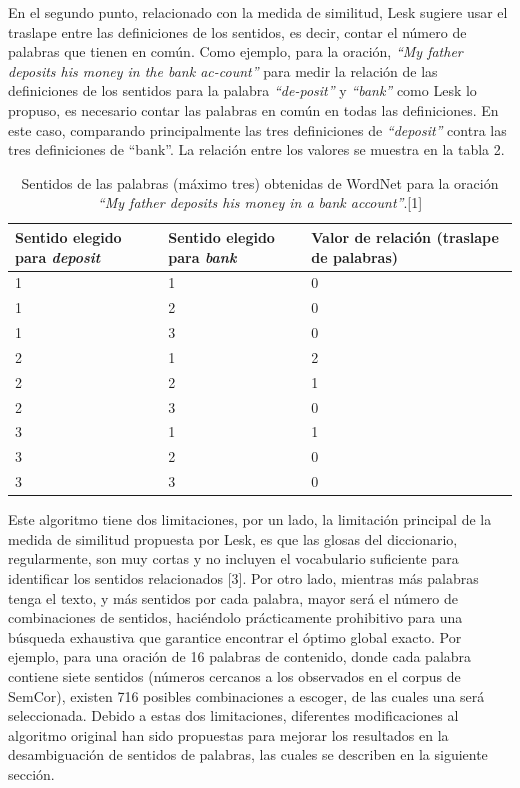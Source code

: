En el segundo punto, relacionado con la medida de similitud, Lesk sugiere usar el traslape entre las definiciones de los sentidos, es decir, contar el número de palabras que tienen en común. 
Como ejemplo, para la oración, \textit{“My father deposits his money in the bank ac-count”} para medir la relación de las definiciones de los sentidos para la palabra \textit{“de-posit”} y \textit{“bank”} como Lesk lo propuso, es necesario contar las palabras en común en todas las definiciones. En este caso, comparando principalmente las tres definiciones de \textit{“deposit”} contra las tres definiciones de “bank”. La relación entre los valores se muestra en la tabla 2.

\begin{table}[t]
  \centering
    \begin{tabular}{|m{4cm}|m{4cm}|m{4cm}|}
      \hline
      Sentido elegido para \textit{deposit} & Sentido elegido para \textit{bank} & Valor de relación (traslape de palabras)\\
      \hline
      1 & 1 & 0 \\
      \hline
      1 & 2 & 0 \\
      \hline
      1 & 3 & 0 \\
      \hline
      2 & 1 & 2 \\
      \hline
      2 & 2 & 1 \\
      \hline
      2 & 3 & 0 \\
      \hline
      3 & 1 & 1 \\
      \hline
      3 & 2 & 0 \\
      \hline
      3 & 3 & 0 \\
      \hline
     \end{tabular}
   \caption{Sentidos de las palabras (máximo tres) obtenidas de WordNet para la oración \textit{“My father deposits his money in a bank account”}.[1]
  }\label{tab:demo2}
\end{table}

Este algoritmo tiene dos limitaciones, por un lado, la limitación principal de la medida de similitud propuesta por Lesk, es que las glosas del diccionario, regularmente, son muy cortas y no incluyen el vocabulario suficiente para identificar los sentidos relacionados [3]. 
Por otro lado, mientras más palabras tenga el texto, y más sentidos por cada palabra, mayor será el número de combinaciones de sentidos, haciéndolo prácticamente prohibitivo para una búsqueda exhaustiva que garantice encontrar el óptimo global exacto. Por ejemplo, para una oración de 16 palabras de contenido, donde cada palabra contiene siete sentidos (números cercanos a los observados en el corpus de SemCor), existen 716 posibles combinaciones a escoger, de las cuales una será seleccionada. 
Debido a estas dos limitaciones, diferentes modificaciones al algoritmo original han sido propuestas para mejorar los resultados en la desambiguación de sentidos de palabras, las cuales se describen en la siguiente sección.

